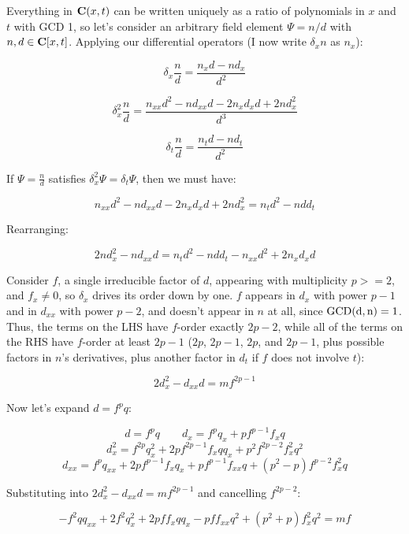 \documentclass{article}
\newcommand{\C}{\ensuremath{{\bf C}}}
\newcommand{\GCD}{\ensuremath{\rm{GCD}}}
\begin{document}
Everything in ${\bf C}(x,t)$ can be written uniquely as a ratio of
polynomials in $x$ and $t$ with GCD 1, so let's consider an arbitrary
field element $\Psi = n/d$ with $n,d\in\C[x,t]$.  Applying our
differential operators (I now write $\delta_x n$ as $n_x$):

$$\delta_x \frac{n}{d} = \frac{n_x d - n d_x}{d^2}$$

$$\delta_x^2 \frac{n}{d} = \frac{n_{xx} d^2 - n d_{xx} d - 2 n_{x}d_{x}d + 2nd_x^2}{d^3}$$

$$\delta_t \frac{n}{d} = \frac{n_t d - n d_t}{d^2}$$

If $\Psi = \frac{n}{d}$ satisfies $\delta_x^2 \Psi = \delta_t \Psi$, then we must have:

$$n_{xx} d^2 - n d_{xx} d - 2 n_{x}d_{x}d + 2nd_x^2 = n_t d^2 - n d d_t$$

Rearranging:

$$2nd_x^2 - n d_{xx} d = n_t d^2 - n d d_t - n_{xx} d^2 + 2 n_{x}d_{x}d$$

\begin{comment}
Notice that $d$ divides everything on the RHS, so it must also divide the LHS.
We know $\GCD(n,d)=1$, by hypothesis, and we just concluded that
$d$ can't divide $d_x$, so it can't divide the LHS.  Contradiction.
\end{comment}

Consider $f$, a single irreducible factor of $d$,
appearing with multiplicity $p >= 2$, and $f_x \ne 0$, so $\delta_x$ drives
its order down by one.  $f$ appears in $d_x$ with power $p-1$ and in
$d_{xx}$ with power $p-2$, and doesn't appear in $n$ at all, since
$\GCD(d,n)=1$.  Thus, the terms on the LHS have $f$-order exactly
$2p-2$, while all of the terms on the RHS have $f$-order at least
$2p-1$ ($2p$, $2p-1$, $2p$, and $2p-1$, plus possible factors in $n$'s
derivatives, plus another factor in $d_t$ if $f$ does not
involve $t$):

$$2d_x^2 - d_{xx} d = m f^{2p-1}$$

Now let's expand $d=f^pq$:

$$d = f^p q \qquad d_x = f^{p}q_x +pf^{p -1}f_xq$$
$$d_x^2 = f^{2p}q_x^{2} +2pf^{2p -1}f_xqq_x +p^{2}f^{2p -2}f_x^{2}q^{2}$$
$$d_{xx} = f^{p}q_{xx} +2pf^{p -1}f_xq_x +pf^{p -1}f_{xx}q +(p^{2} -p)f^{p -2}f_x^{2}q$$

Substituting into $2d_x^2 - d_{xx} d = m f^{2p-1}$ and cancelling $f^{2p-2}$:

$$-f^{2}qq_{xx} +2f^{2}q_x^{2} +2pff_xqq_x -pff_{xx}q^{2} +(p^{2} +p)f_x^{2}q^{2} = m f$$
\end{document}
